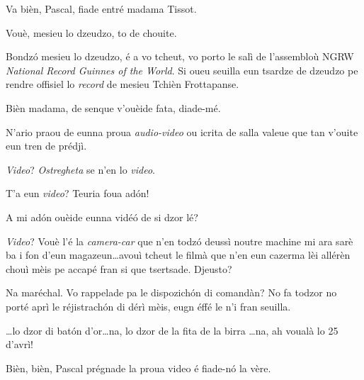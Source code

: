 \begin{drama}
\DzeudzoSenliquerspeaks Va bièn, Pascal, fiade entré madama Tissot.

\Pascalspeaks Vouè, mesieu lo dzeudzo, to de chouite.


\Tissotspeaks Bondzó mesieu lo dzeudzo, é a vo tcheut, vo porto le salì de l'assembloù NGRW \textit{National Record Guinnes of the World}. Si oueu seuilla eun tsardze de dzeudzo pe rendre offisiel lo \textit{record} de mesieu Tchièn Frottapanse.

\DzeudzoSenliquerspeaks {} Bièn madama, de senque v'ouèide fata, diade-mé.

\Tissotspeaks N’ario praou de eunna proua \textit{audio-video} ou icrita de salla valeue que tan v'ouite eun tren de prédjì.

\Tacspeaks \textit{Video}? \textit{Ostregheta} se n’en lo \textit{video}.

\Cienspeaks T'a eun \textit{video}? Teuria foua adón!

\DzeudzoSenliquerspeaks {} A mi adón ouèide eunna vidé\'o de si dzor lé?

\Ticspeaks {} \textit{Video}? Vouè l’é la \textit{camera-car} que n’en todzó deussì noutre machine mi ara sarè ba i fon d'eun magazeun\ldots avouì tcheut le filmà que n’en eun cazerma lèi allérèn chouì mèis pe accapé fran si que tsertsade.  Djeusto?

\Tacspeaks Na maréchal. Vo rappelade pa le dispozichón di comandàn? No fa todzor no porté aprì le réjistrachón di dérì mèis, eugn éffé le n’i fran seuilla. 


\Tacspeaks \ldots lo dzor di bat\'on d'or\ldots na, lo dzor de la fita de la birra \ldots na, ah voualà lo 25 d'avrì!

\DzeudzoSenliquerspeaks Bièn, bièn, Pascal prégnade la proua video é fiade-n\'o la vère.




\end{drama}
